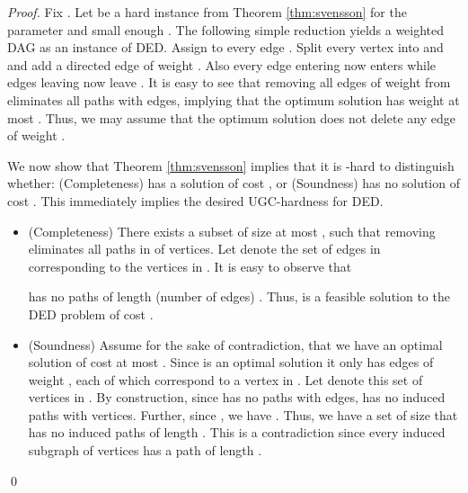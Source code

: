 \documentclass[oribibl]{llncs}
\newcommand{\mink}{{\sc DED}\xspace}
\begin{document}
\begin{proof}
Fix . Let  be a hard
instance from Theorem \ref{thm:svensson} for the parameter  and
small enough . 
The following simple reduction yields a weighted DAG  as an instance of \mink. 
Assign  to every edge . Split
every vertex  into  and  and add a directed edge
 of weight . Also every edge entering  now
enters  while edges leaving  now leave . It is
easy to see that removing all edges of weight  from  eliminates
all paths with  edges, implying that the optimum solution has
weight at most . Thus, we may assume that the optimum solution
does not delete any edge of weight . 

We now show that Theorem \ref{thm:svensson} implies that it is
-hard to distinguish whether: (Completeness)  has a
solution of cost , or (Soundness)  
has no solution of cost . This immediately implies the
desired 
UGC-hardness for \mink.
\begin{itemize} 
	\item (Completeness) There exists a subset  of
			size at most , such
			that removing  eliminates all paths in 
			of  vertices. Let  denote
			the set of edges in  corresponding to the
			vertices in . It is easy to observe that
		 	
			has no paths of length (number of edges) .
			Thus,  is a feasible solution to the \mink
			problem of cost .
		
	\item (Soundness) Assume for the sake of contradiction, that
		we have an optimal solution  of cost at
		most . Since  is an optimal
		solution it only has edges of weight , each
		of which correspond to a vertex in .
		Let  denote this set of vertices in . By
		construction, since  has no paths with  edges, 
		has no induced paths with  vertices. 
		Further,
		since , we have . Thus, we have a set of size
		 that has no induced paths of length .
		This is a contradiction since every induced subgraph
		of  vertices has a path of length
		.  
\end{itemize} 
\qed 
\end{proof}




\end{document}
